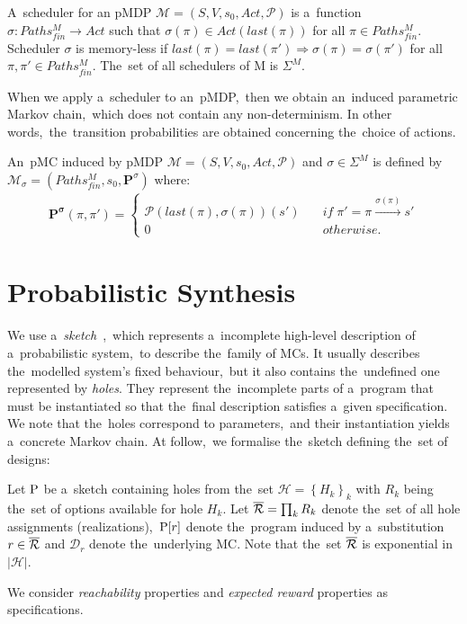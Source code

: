 \begin{definition}[Scheduler]
A~scheduler for an pMDP $\mathcal{M} = (S, V, s_0, Act, \mathcal{P})$ is a~function $\sigma: Paths_{fin}^{M} \rightarrow Act$ such that $\sigma(\pi) \in Act(last(\pi))$ for all $\pi \in Paths_{fin}^{M}$.
Scheduler $\sigma$ is memory-less if $last(\pi) = last(\pi') \Longrightarrow \sigma(\pi) = \sigma(\pi')$ for all $\pi, \pi' \in Paths_{fin}^{M}$.
The~set of all schedulers of M is $\Sigma^M$.
\end{definition}
\noindent 
When we apply a~scheduler to an~pMDP,~then we obtain an~induced parametric Markov chain,~which does not contain any non-determinism.
In other words,~the~transition probabilities are obtained concerning the~choice of actions.

\begin{definition} \label{def:incuded_mc}
\cite{cegar}
An~pMC induced by pMDP $\mathcal{M} = (S, V, s_0, Act, \mathcal{P})$ and $\sigma \in \Sigma^M$ is defined by $\mathcal{M}_{\sigma} = ( Paths_{fin}^{M}, s_0, \mathbf{P}^{\sigma})$ where:
\begin{align*}
    \mathbf{P^{\sigma}}(\pi, \pi') = 
    \begin{cases}
        \mathcal{P}(last(\pi), \sigma(\pi))(s') \quad & if \; \pi' = \pi \overset{\sigma(\pi)}{\rightarrow} s' \\
         0 \quad & otherwise.
    \end{cases}
\end{align*}
\end{definition}


\section{Probabilistic Synthesis}
We use a~\textit{sketch}~\cite{sketching1,sygus},~which represents a~incomplete high-level description of a~probabilistic system,~to describe the~family of MCs.
It usually describes the~modelled system's fixed behaviour,~but it also contains the~undefined one represented by \textit{holes}.
They represent the~incomplete parts of a~program that must be instantiated so that the~final description satisfies a~given specification.
We note that the~holes correspond to parameters,~and their instantiation yields a~concrete Markov chain.
At follow,~we formalise the~sketch defining the~set of designs:

\begin{definition}[Sketch]
Let $\mathrm{P}$ be a~sketch containing holes from the~set $\mathcal{H} = \left\{ H_k \right \}_k$ with $R_k$ being the~set of options available for hole $H_k$.
Let $\overline{\mathcal{R}} = \prod_k R_k$ denote the~set of all hole assignments (realizations),~$\mathrm{P}[r]$ denote the~program induced by a~substitution $r \in \overline{\mathcal{R}}$ and $\mathcal{D}_r$ denote the~underlying MC.
Note that the~set $\overline{\mathcal{R}}$ is exponential in $\lvert \mathcal{H} \rvert$.
\end{definition}
\noindent
We consider \textit{reachability} properties and \textit{expected reward} properties as specifications.


